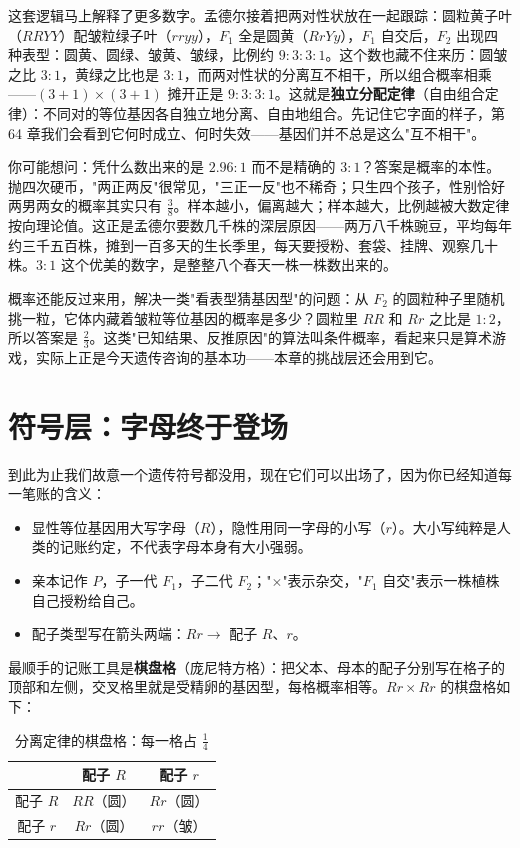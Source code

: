 这套逻辑马上解释了更多数字。孟德尔接着把两对性状放在一起跟踪：圆粒黄子叶（$RRYY$）配皱粒绿子叶（$rryy$），$F_1$ 全是圆黄（$RrYy$），$F_1$ 自交后，$F_2$ 出现四种表型：圆黄、圆绿、皱黄、皱绿，比例约 $9:3:3:1$。这个数也藏不住来历：圆皱之比 $3:1$，黄绿之比也是 $3:1$，而两对性状的分离互不相干，所以组合概率相乘——$(3+1)\times(3+1)$ 摊开正是 $9:3:3:1$。这就是\textbf{独立分配定律}（自由组合定律）：不同对的等位基因各自独立地分离、自由地组合。先记住它字面的样子，第 64 章我们会看到它何时成立、何时失效——基因们并不总是这么"互不相干"。

你可能想问：凭什么数出来的是 $2.96:1$ 而不是精确的 $3:1$？答案是概率的本性。抛四次硬币，"两正两反"很常见，"三正一反"也不稀奇；只生四个孩子，性别恰好两男两女的概率其实只有 $\frac{3}{8}$。样本越小，偏离越大；样本越大，比例越被大数定律按向理论值。这正是孟德尔要数几千株的深层原因——两万八千株豌豆，平均每年约三千五百株，摊到一百多天的生长季里，每天要授粉、套袋、挂牌、观察几十株。$3:1$ 这个优美的数字，是整整八个春天一株一株数出来的。

概率还能反过来用，解决一类"看表型猜基因型"的问题：从 $F_2$ 的圆粒种子里随机挑一粒，它体内藏着皱粒等位基因的概率是多少？圆粒里 $RR$ 和 $Rr$ 之比是 $1:2$，所以答案是 $\frac{2}{3}$。这类"已知结果、反推原因"的算法叫条件概率，看起来只是算术游戏，实际上正是今天遗传咨询的基本功——本章的挑战层还会用到它。

\section{符号层：字母终于登场}

到此为止我们故意一个遗传符号都没用，现在它们可以出场了，因为你已经知道每一笔账的含义：

\begin{itemize}[itemsep=2pt]
\item 显性等位基因用大写字母（$R$），隐性用同一字母的小写（$r$）。大小写纯粹是人类的记账约定，不代表字母本身有大小强弱。
\item 亲本记作 $P$，子一代 $F_1$，子二代 $F_2$；"$\times$"表示杂交，"$F_1$ 自交"表示一株植株自己授粉给自己。
\item 配子类型写在箭头两端：$Rr \rightarrow$ 配子 $R$、$r$。
\end{itemize}

最顺手的记账工具是\textbf{棋盘格}（庞尼特方格）：把父本、母本的配子分别写在格子的顶部和左侧，交叉格里就是受精卵的基因型，每格概率相等。$Rr \times Rr$ 的棋盘格如下：

\begin{table}[htbp]
\centering
\caption{分离定律的棋盘格：每一格占 $\frac{1}{4}$}
\begin{tabular}{c|cc}
\toprule
 & 配子 $R$ & 配子 $r$ \\
\midrule
配子 $R$ & $RR$（圆） & $Rr$（圆） \\
配子 $r$ & $Rr$（圆） & $rr$（皱） \\
\bottomrule
\end{tabular}
\end{table}

